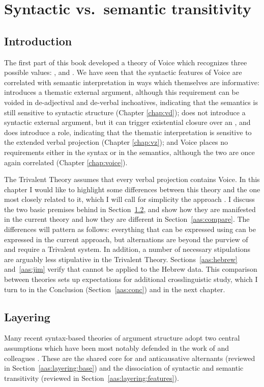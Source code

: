 \chapter{Syntactic vs.~semantic transitivity}
\label{chap:aas}

\section{Introduction} \label{sec:intro}
The first part of this book developed a theory of Voice which recognizes three possible values: {\vd}, {\vz} and . We have seen that the syntactic features of Voice are correlated with semantic interpretation in ways which themselves are informative: {\vd} introduces a thematic external argument, although this requirement can be voided in de-adjectival and de-verbal inchoatives, indicating that the semantics is still sensitive to syntactic structure (Chapter \ref{chap:vd}); {\vz} does not introduce a syntactic external argument, but it can trigger existential closure over an , and {\pz} does introduce a  role, indicating that the thematic interpretation is sensitive to the extended verbal projection (Chapter \ref{chap:vz}); and Voice places no requirements either in the syntax or in the semantics, although the two are once again correlated (Chapter \ref{chap:voice}).

The Trivalent Theory assumes that every verbal projection contains Voice. In this chapter I would like to highlight some differences between this theory and the one most closely related to it, which I will call for simplicity the \textsc{} approach \citep{schaefer08,layering15}. I discuss the two basic premises behind  in Section~\ref{aas:layering}, and show how they are manifested in the current theory and how they are different in Section~\ref{aas:compare}. The differences will pattern as follows: everything that can be expressed using  can be expressed in the current approach, but  alternations are beyond the purview of  and require a Trivalent system. In addition, a number of necessary stipulations are arguably less stipulative in the Trivalent Theory. Sections~\ref{aas:hebrew} and~\ref{aas:jim} verify that  cannot be applied to the Hebrew data. This comparison between theories sets up expectations for additional crosslinguistic study, which I turn to in the Conclusion (Section~\ref{aas:conc}) and in the next chapter.


\section{Layering} \label{aas:layering}
Many recent syntax-based theories of argument structure adopt two central assumptions which have been most notably defended in the work of \cite{schaefer08} and colleagues \citep{alexiadouetal06,layering15}. These are the shared core for  and anticausative alternants (reviewed in Section~\ref{aas:layering:base}) and the dissociation of syntactic and semantic transitivity (reviewed in Section~\ref{aas:layering:features}).

